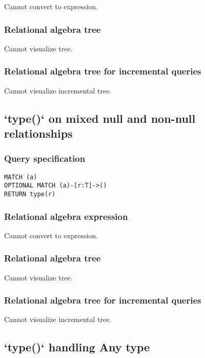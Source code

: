 Cannot convert to expression.

\subsubsection*{Relational algebra tree}

Cannot visualize tree.

\subsubsection*{Relational algebra tree for incremental queries}

Cannot visualize incremental tree.

\subsection{`type()` on mixed null and non-null relationships}

\subsubsection*{Query specification}

\begin{lstlisting}
MATCH (a)
OPTIONAL MATCH (a)-[r:T]->()
RETURN type(r)
\end{lstlisting}

\subsubsection*{Relational algebra expression}

Cannot convert to expression.

\subsubsection*{Relational algebra tree}

Cannot visualize tree.

\subsubsection*{Relational algebra tree for incremental queries}

Cannot visualize incremental tree.

\subsection{`type()` handling Any type}

